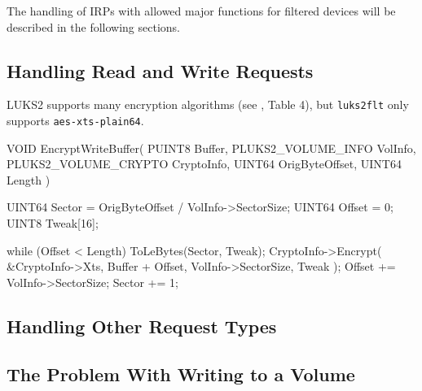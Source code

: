The handling of IRPs with allowed major functions for filtered devices will be described in the following  sections.

\subsection{Handling Read and Write Requests}
\label{chap:ourapproach.final.de_encrypting}


LUKS2 supports many encryption algorithms (see \cite{Broz2018}, Table 4), but \texttt{luks2flt} only supports \texttt{aes-xts-plain64}.

\begin{ccode}
VOID
EncryptWriteBuffer(
    PUINT8 Buffer,
    PLUKS2_VOLUME_INFO VolInfo,
    PLUKS2_VOLUME_CRYPTO CryptoInfo,
    UINT64 OrigByteOffset,
    UINT64 Length
)
{
    UINT64 Sector = OrigByteOffset / VolInfo->SectorSize;
    UINT64 Offset = 0;
    UINT8 Tweak[16];

    while (Offset < Length) {
        ToLeBytes(Sector, Tweak);
        CryptoInfo->Encrypt(
            &CryptoInfo->Xts, Buffer + Offset,
            VolInfo->SectorSize, Tweak
        );
        Offset += VolInfo->SectorSize;
        Sector += 1;
    }
}
\end{ccode}

\subsection{Handling Other Request Types}
\label{chap:ourapproach.final.otherrequests}


\subsection{The Problem With Writing to a Volume}
\label{chap:ourapproach.final.writeproblem}

